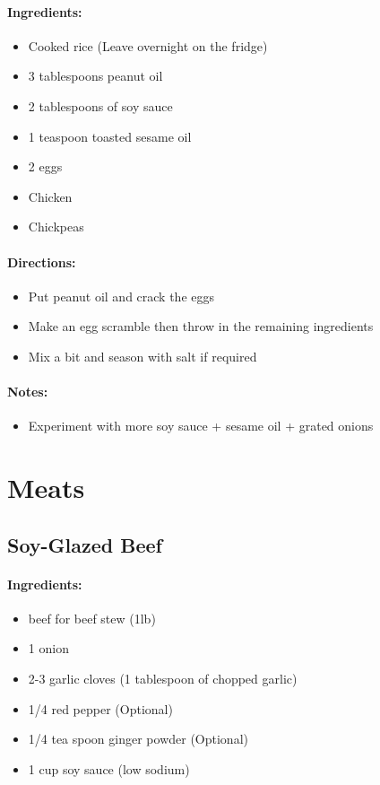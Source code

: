 \documentclass{article}
\begin{document}
\paragraph{Ingredients:}
\begin{itemize}
    \item Cooked rice (Leave overnight on the fridge)
    \item 3 tablespoons peanut oil
    \item 2 tablespoons of soy sauce
    \item 1 teaspoon toasted sesame oil
    \item 2 eggs
    \item Chicken
    \item Chickpeas
\end{itemize}

\paragraph{Directions:}
\begin{itemize}
    \item Put peanut oil and crack the eggs
    \item Make an egg scramble then throw in the remaining ingredients
    \item Mix a bit and season with salt if required
\end{itemize}

\paragraph{Notes:}
\begin{itemize}
    \item Experiment with more soy sauce + sesame oil + grated onions
\end{itemize}

\section{Meats}


\subsection{Soy-Glazed Beef}

\paragraph{Ingredients:}
\begin{itemize}
    \item beef for beef stew (1lb)
    \item 1 onion
    \item 2-3 garlic cloves (1 tablespoon of chopped garlic)
    \item 1/4 red pepper (Optional)
    \item 1/4 tea spoon ginger powder (Optional)
    \item 1 cup soy sauce (low sodium)
\end{itemize}
\end{document}
